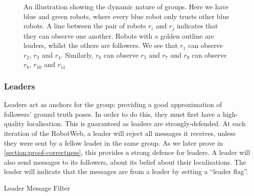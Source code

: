 \begin{figure}[!h]
	\centering
	

	\caption[Dynamic Groups]{An illustration showing the dynamic nature of groups. Here we have blue and green robots, where every blue robot only trusts other blue robots. A line between the pair of robots $r_i$ and $r_j$ indicates that they can observe one another. Robots with a golden outline are leaders, whilst the others are followers. We see that $r_1$ can observe  $r_2$, $r_3$ and $r_4$. Similarly, $r_6$ can observe $r_5$ and $r_7$ and $r_9$ can observe $r_8$, $r_{10}$ and $r_{11}$}
 \label{fig:dyn_group}
\end{figure}


\subsubsection{Leaders}
Leaders act as anchors for the group; providing a good approximation of followers' ground truth poses. In order to do this, they must first have a high-quality localisation. This is guaranteed as leaders are strongly-defended. At each iteration of the RobotWeb, a leader will reject all messages it receives, unless they were sent by a fellow leader in the same group. As we later prove in \autoref{section:proof-correctness}, this provides a strong defence for leaders. A leader will also send messages to its followers, about its belief about their localisations. The leader will indicate that the messages are from a leader by setting a ``leader flag''.


{}

\begin{algorithm}[H]
\DontPrintSemicolon
\caption{Leader Message Filter}\label{alg:leader-msg-filter}



\BlankLine
{}
\end{algorithm}

